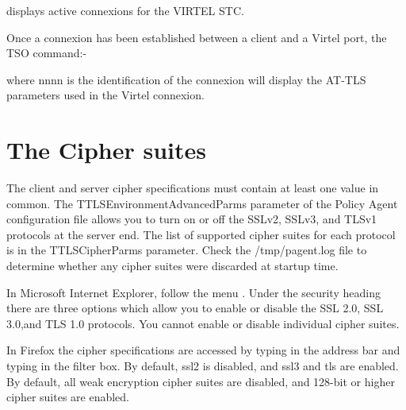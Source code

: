\documentclass[letterpaper,10pt,english]{sphinxmanual}
\begin{document}
displays active connexions for the VIRTEL STC.

Once a connexion has been established between a client and a Virtel port, the TSO command:-

\begin{sphinxVerbatim}[commandchars=\\\{\}]
    
\end{sphinxVerbatim}

where nnnn is the identification of the connexion will display the AT-TLS parameters used in the Virtel connexion.

\newpage


\section{The Cipher suites}
\label{\detokenize{connectivity_guide:index-160}}\label{\detokenize{connectivity_guide:the-cipher-suites}}
The client and server cipher specifications must contain at least one value in common. The TTLSEnvironmentAdvancedParms parameter of the Policy Agent configuration file allows you to turn on or off the SSLv2, SSLv3, and TLSv1 protocols at the server end. The list of supported cipher suites for each protocol is in the TTLSCipherParms parameter. Check the /tmp/pagent.log file to determine whether any cipher suites were discarded at startup time.

In Microsoft Internet Explorer, follow the menu . Under the security heading there are three options which allow you to enable or disable the SSL 2.0, SSL 3.0,and TLS 1.0 protocols. You cannot enable or disable individual cipher suites.

In Firefox the cipher specifications are accessed by typing  in the address bar and typing  in the filter box. By default, ssl2 is disabled, and ssl3 and tls are enabled. By default, all weak encryption cipher suites are disabled, and 128-bit or higher cipher suites are enabled.

\end{document}
